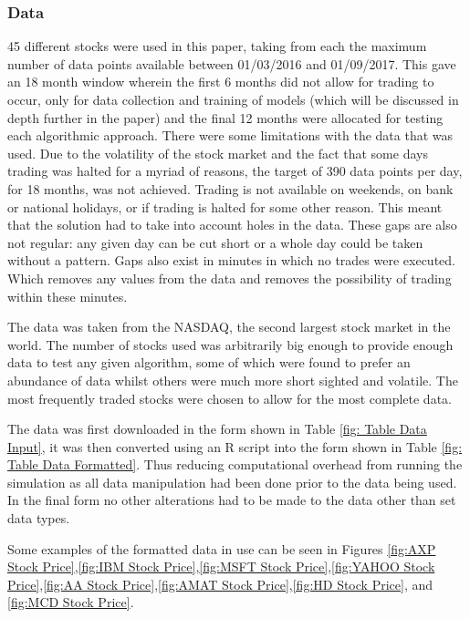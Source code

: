 \documentclass[conference]{IEEEtran}
\begin{document}
\subsubsection{Data}

45 different stocks were used in this paper, taking from each the maximum number of data points available between 01/03/2016 and 01/09/2017. This gave an 18 month window wherein the first 6 months did not allow for trading to occur, only for data collection and training of models (which will be discussed in depth further in the paper) and the final 12 months were allocated for testing each algorithmic approach. There were some limitations with the data that was used. Due to the volatility of the stock market and the fact that some days trading was halted for a myriad of reasons, the target of 390 data points per day, for 18 months, was not achieved. Trading is not available on weekends, on bank or national holidays, or if trading is halted for some other reason. This meant that the solution had to take into account holes in the data. These gaps are also not regular: any given day can be cut short or a whole day could be taken without a pattern. Gaps also exist in minutes in  which no trades were executed. Which removes any values from the data and removes the possibility of trading within these minutes.

The data was taken from the NASDAQ, the second largest stock market in the world. The number of stocks used was arbitrarily big enough to provide enough data to test any given algorithm, some of which were found to prefer an abundance of data whilst others were much more short sighted and volatile. The most frequently traded stocks were chosen to allow for the most complete data.

The data was first downloaded in the form shown in Table \ref{fig: Table Data Input}, it was then converted using an R script into the form shown in Table \ref{fig: Table Data Formatted}. Thus reducing computational overhead from running the simulation as all data manipulation had been done prior to the data being used. In the final form no other alterations had to be made to the data other than set data types. 

Some examples of the formatted data in use can be seen in Figures  \ref{fig:AXP Stock Price},\ref{fig:IBM Stock Price},\ref{fig:MSFT Stock Price},\ref{fig:YAHOO Stock Price},\ref{fig:AA Stock Price},\ref{fig:AMAT Stock Price},\ref{fig:HD Stock Price}, and \ref{fig:MCD Stock Price}.
\end{document}
